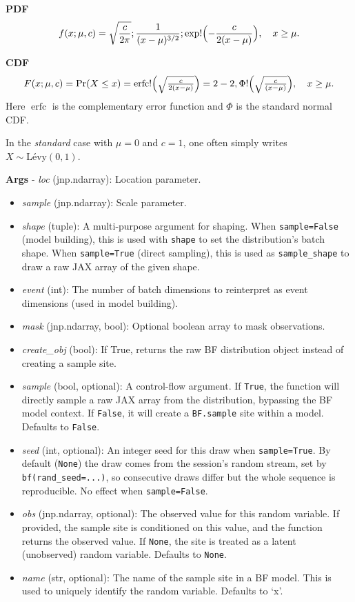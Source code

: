 \documentclass[
  letterpaper,
  DIV=11,
  numbers=noendperiod]{scrartcl}
\begin{document}
\textbf{PDF} \[
f(x; \mu, c) = \sqrt{\frac{c}{2\pi}} ; \frac{1}{(x - \mu)^{3/2}} ; \exp!\Bigl( -\frac{c}{2 (x - \mu)} \Bigr),
\quad x \ge \mu.
\]

\textbf{CDF} \[
F(x; \mu, c) = \Pr(X \le x)
= \operatorname{erfc}!\Bigl(\sqrt{\tfrac{c}{2 (x - \mu)}}\Bigr)
= 2 - 2,\Phi!\Bigl(\sqrt{\tfrac{c}{(x - \mu)}}\Bigr),
\quad x \ge \mu.
\] Here \(\operatorname{erfc}\) is the complementary error function and
\(\Phi\) is the standard normal CDF.

In the \emph{standard} case with \(\mu = 0\) and \(c = 1\), one often
simply writes \(X \sim \text{Lévy}(0,1)\).

\textbf{Args} - \emph{loc} (jnp.ndarray): Location parameter.

\begin{itemize}
\item
  \emph{sample} (jnp.ndarray): Scale parameter.
\item
  \emph{shape} (tuple): A multi-purpose argument for shaping. When
  \texttt{sample=False} (model building), this is used with
  \texttt{shape} to set the distribution's batch shape. When
  \texttt{sample=True} (direct sampling), this is used as
  \texttt{sample\_shape} to draw a raw JAX array of the given shape.
\item
  \emph{event} (int): The number of batch dimensions to reinterpret as
  event dimensions (used in model building).
\item
  \emph{mask} (jnp.ndarray, bool): Optional boolean array to mask
  observations.
\item
  \emph{create\_obj} (bool): If True, returns the raw BF distribution
  object instead of creating a sample site.
\item
  \emph{sample} (bool, optional): A control-flow argument. If
  \texttt{True}, the function will directly sample a raw JAX array from
  the distribution, bypassing the BF model context. If \texttt{False},
  it will create a \texttt{BF.sample} site within a model. Defaults to
  \texttt{False}.
\item
  \emph{seed} (int, optional): An integer seed for this draw when
  \texttt{sample=True}. By default (\texttt{None}) the draw comes from
  the session's random stream, set by \texttt{bf(rand\_seed=...)}, so
  consecutive draws differ but the whole sequence is reproducible. No
  effect when \texttt{sample=False}.
\item
  \emph{obs} (jnp.ndarray, optional): The observed value for this random
  variable. If provided, the sample site is conditioned on this value,
  and the function returns the observed value. If \texttt{None}, the
  site is treated as a latent (unobserved) random variable. Defaults to
  \texttt{None}.
\item
  \emph{name} (str, optional): The name of the sample site in a BF
  model. This is used to uniquely identify the random variable. Defaults
  to `x'.
\end{itemize}
\end{document}
